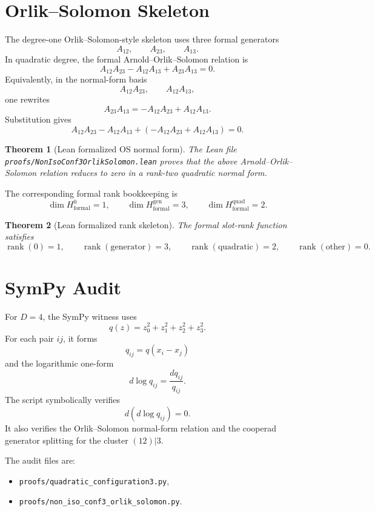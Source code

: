 \documentclass[11pt]{article}
\newtheorem{theorem}{Theorem}[section]
\begin{document}
\section{Orlik--Solomon Skeleton}
The degree-one Orlik--Solomon-style skeleton uses three formal generators
\[
A_{12},
\qquad
A_{23},
\qquad
A_{13}.
\]
In quadratic degree, the formal Arnold--Orlik--Solomon relation is
\[
A_{12}A_{23}-A_{12}A_{13}+A_{23}A_{13}=0.
\]
Equivalently, in the normal-form basis
\[
A_{12}A_{23},
\qquad
A_{12}A_{13},
\]
one rewrites
\[
A_{23}A_{13}
=
-A_{12}A_{23}+A_{12}A_{13}.
\]
Substitution gives
\[
A_{12}A_{23}-A_{12}A_{13}
+
\left(-A_{12}A_{23}+A_{12}A_{13}\right)=0.
\]

\begin{theorem}[Lean formalized OS normal form]
The Lean file \texttt{proofs/NonIsoConf3OrlikSolomon.lean} proves that the above Arnold--Orlik--Solomon relation reduces to zero in a rank-two quadratic normal form.
\end{theorem}

The corresponding formal rank bookkeeping is
\[
\dim H^0_{\mathrm{formal}}=1,
\qquad
\dim H^{\mathrm{gen}}_{\mathrm{formal}}=3,
\qquad
\dim H^{\mathrm{quad}}_{\mathrm{formal}}=2.
\]

\begin{theorem}[Lean formalized rank skeleton]
The formal slot-rank function satisfies
\[
\operatorname{rank}(0)=1,
\qquad
\operatorname{rank}(\mathrm{generator})=3,
\qquad
\operatorname{rank}(\mathrm{quadratic})=2,
\qquad
\operatorname{rank}(\mathrm{other})=0.
\]
\end{theorem}

\section{SymPy Audit}
For $D=4$, the SymPy witness uses
\[
q(z)=z_0^2+z_1^2+z_2^2+z_3^2.
\]
For each pair $ij$, it forms
\[
q_{ij}=q(x_i-x_j)
\]
and the logarithmic one-form
\[
d\log q_{ij}=\frac{dq_{ij}}{q_{ij}}.
\]
The script symbolically verifies
\[
d(d\log q_{ij})=0.
\]
It also verifies the Orlik--Solomon normal-form relation and the cooperad generator splitting for the cluster $(12)|3$.

The audit files are:
\begin{itemize}[leftmargin=2em]
\item \texttt{proofs/quadratic\_configuration3.py},
\item \texttt{proofs/non\_iso\_conf3\_orlik\_solomon.py}.
\end{itemize}
\end{document}
